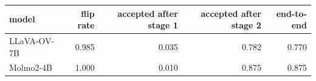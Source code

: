 \footnotesize
\setlength{\tabcolsep}{6pt}
\begin{tabular}{@{}lrrrr@{}}
\toprule
model & flip rate & accepted after stage 1 & accepted after stage 2 & end-to-end \\
\midrule
LLaVA-OV-7B & 0.985 & 0.035 & 0.782 & 0.770 \\
Molmo2-4B & 1.000 & 0.010 & 0.875 & 0.875 \\
\bottomrule
\end{tabular}

